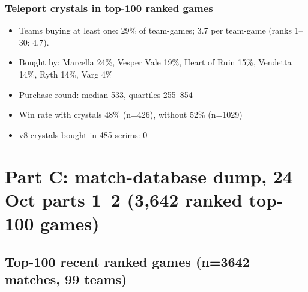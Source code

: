 \documentclass[
  10pt,
]{article}
\providecommand{\tightlist}{%
  \setlength{\itemsep}{0pt}\setlength{\parskip}{0pt}}
\begin{document}
\subsubsection{Teleport crystals in top-100 ranked
games}\label{teleport-crystals-in-top-100-ranked-games}

\begin{itemize}
\tightlist
\item
  Teams buying at least one: 29\% of team-games; 3.7 per team-game
  (ranks 1--30: 4.7).
\item
  Bought by: Marcella 24\%, Vesper Vale 19\%, Heart of Ruin 15\%,
  Vendetta 14\%, Ryth 14\%, Varg 4\%
\item
  Purchase round: median 533, quartiles 255--854
\item
  Win rate with crystals 48\% (n=426), without 52\% (n=1029)
\item
  v8 crystals bought in 485 scrims: 0
\end{itemize}

\section{Part C: match-database dump, 24 Oct parts 1--2 (3,642 ranked
top-100
games)}\label{part-c-match-database-dump-24-oct-parts-12-3642-ranked-top-100-games}

\subsection{Top-100 recent ranked games (n=3642 matches, 99
teams)}\label{top-100-recent-ranked-games-n3642-matches-99-teams}
\end{document}

